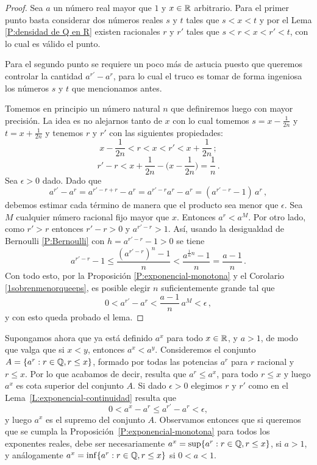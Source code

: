 \begin{proof}
Sea $a$ un número real mayor que $1$ y 
$x \in \mathbb{R}$ arbitrario. Para el primer punto basta considerar dos números reales $s$ y $t$ tales que $s<x<t$ y por el Lema \ref{P:densidad de Q en R} existen racionales $r$ y $r'$ tales que 
$s<r<x<r'<t$, con lo cual es válido el punto. 

Para el segundo punto se requiere un poco más de astucia puesto que queremos controlar la cantidad $a^{r'} - a^{r}$, para lo cual el truco es tomar de forma ingeniosa los números $s$ y $t$ que mencionamos antes.

Tomemos en principio un número natural $n$ que definiremos luego con mayor precisión. La idea es no alejarnos tanto de $x$ con lo cual tomemos $s=x-\frac{1}{2n}$ y $t=x+\frac{1}{2n}$ y tenemos $r$ y $r'$ con las siguientes propiedades:
\[ x-\frac{1}{2n} <r<x<r'< x+\frac{1}{2n}\,;\]
\[ r'-r < x+\frac{1}{2n} - 
\Big( x-\frac{1}{2n} \Big) = \frac1n\,.\]
Sea $\epsilon >0$ dado. Dado que 
\[ a^{r'} - a^{r} = a^{r'-r+r} - a^{r}
= a^{r'-r}a^{r} - a^{r}
=(a^{r'-r}-1)\,a^{r}\,,\]
debemos estimar cada término de manera que el producto sea menor que $\epsilon$.
Sea $M$ cualquier número racional fijo mayor que $x$. Entonces $a^r < a^M$. Por otro lado, como $r'>r$ entonces $r'-r>0$ y $a^{r'-r}>1$. Así, usando la desigualdad de Bernoulli \ref{P:Bernoulli} con $h=a^{r'-r}-1>0$ se tiene
\[ a^{r'-r}-1 \leq \frac{(a^{r'-r})^n-1}{n} < \frac{a^{\frac1n n}-1}{n} = \frac{a-1}{n}\,. \]
Con todo esto, por la Proposición 
\ref{P:exponencial-monotona} y el Corolario \ref{1sobrenmenorqueeps}, es posible elegir $n$ suficientemente grande tal que 
\[  0<a^{r'} - a^{r} < \frac{a-1}{n}\,a^M < \epsilon\,,\]
y con esto queda probado el lema.
\end{proof}

Supongamos ahora que ya está definido $a^x$ para todo $x\in\mathbb{R}$, y $a>1$, de modo que valga que si $x<y$, entonces $a^x<a^y$.
Consideremos el conjunto $A=\{a^r: r\in\mathbb{Q}, r\le x\}$, formado por todas las potencias $a^r$ para $r$ racional y $r\le x$.
Por lo que acabamos de decir, resulta que $a^r\le a^x$, para todo $r\le x$ y luego $a^x$ es cota superior del conjunto $A$.
Si dado $\epsilon > 0$ elegimos $r$ y $r'$ como en el Lema~\ref{L:exponencial-continuidad}  resulta que 
\[
    0 < a^x - a^r \le a^{r'} - a^r < \epsilon ,
\]
y luego $a^x$ es el supremo del conjunto $A$.
Observamos entonces que si queremos que se cumpla la Proposición~\ref{P:exponencial-monotona} para todos los exponentes reales, debe ser necesariamente $a^x= \sup\{a^r: r\in\mathbb{Q}, r\le x\}$, si $a>1$, y análogamente $a^x= \inf\{a^r: r\in\mathbb{Q}, r\le x\}$ si $0<a<1$.

